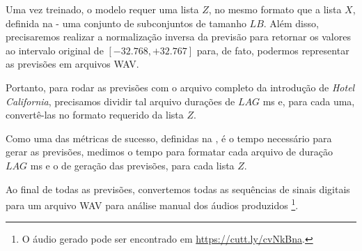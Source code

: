 Uma vez treinado, o modelo requer uma lista $Z$, no mesmo formato que a lista $X$, definida na  - uma conjunto de subconjuntos de tamanho $LB$. Além disso, precisaremos realizar a normalização inversa da previsão para retornar os valores ao intervalo original de $[-32.768, +32.767]$ para, de fato, podermos representar as previsões em arquivos WAV.

Portanto, para rodar as previsões com o arquivo completo da introdução de \textit{Hotel California}, precisamos dividir tal arquivo durações de $LAG$ ms e, para cada uma, convertê-las no formato requerido da lista $Z$.

Como uma das métricas de sucesso, definidas na , é o tempo necessário para gerar as previsões, medimos o tempo para formatar cada arquivo de duração $LAG$ ms e o de geração das previsões, para cada lista $Z$.

Ao final de todas as previsões, convertemos todas as sequências de sinais digitais para um arquivo WAV para análise manual dos áudios produzidos \footnote{O áudio gerado pode ser encontrado em \url{https://cutt.ly/cvNkBna}.}.